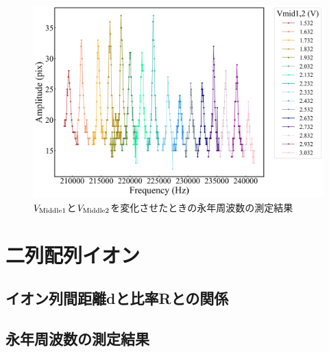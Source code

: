\begin{figure}[h]
	\begin{center}
		\includegraphics[width = 0.7\linewidth]{./results/figure/mid-SecFreq.jpg}
		\caption{$V_{\rm Middle1}$と$V_{\rm Middle2}$を変化させたときの永年周波数の測定結果}
		\label{fig:mid_MeasSec}
	\end{center}
\end{figure}

\section{二列配列イオン}
\subsection{イオン列間距離dと比率Rとの関係}
\subsection{永年周波数の測定結果}